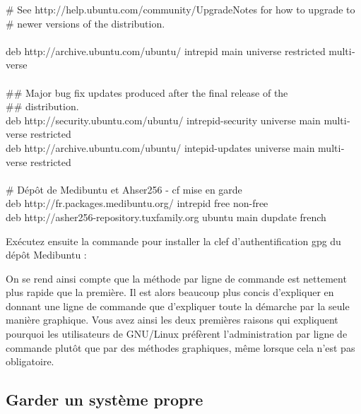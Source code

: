{%
	\begin{breakbox}%
		\begin{otherlanguage}{english}%
\# See http://help.ubuntu.com/community/UpgradeNotes for how to upgrade to\\
\# newer versions of the distribution.\\
\\
deb http://archive.ubuntu.com/ubuntu/ intrepid main universe restricted multiverse\\
\\
\#\# Major bug fix updates produced after the final release of the\\
\#\# distribution.\\
deb http://security.ubuntu.com/ubuntu/ intrepid-security universe main multiverse restricted\\
deb http://archive.ubuntu.com/ubuntu/ intepid-updates universe main multiverse restricted\\
\\
\# Dépôt de Medibuntu et Ahser256 - cf mise en garde\\
deb http://fr.packages.medibuntu.org/ intrepid free non-free\\
deb http://asher256-repository.tuxfamily.org ubuntu main dupdate french\\
		\end{otherlanguage}%
	\end{breakbox}%
\par
Exécutez ensuite la commande pour installer la clef d'authentification gpg du dépôt Medibuntu :\\\par
\begin{nota}
On se rend ainsi compte que la méthode par ligne de commande est nettement plus rapide que la première. Il est alors beaucoup plus concis d'expliquer en donnant une ligne de commande que d'expliquer toute la démarche par la seule manière graphique. Vous avez ainsi les deux premières raisons qui expliquent pourquoi les utilisateurs de GNU/Linux préfèrent l'administration par ligne de commande plutôt que par des méthodes graphiques, même lorsque cela n'est pas obligatoire.
\end{nota}
\subsection{Garder un système propre}
\label{RefNettoyerSysteme}
}
